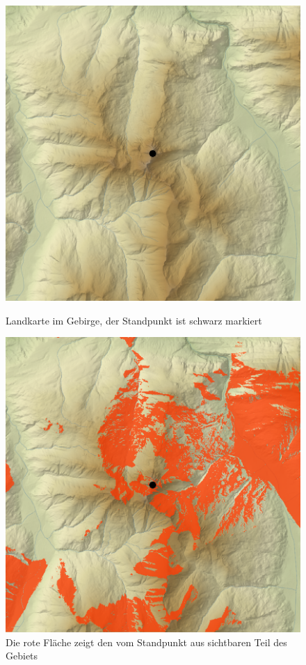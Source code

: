 \begin{figure}[!ht]
\begin{minipage}{0.45\textwidth}
\centering
\includegraphics[scale=0.85]{bilder/berg_viewpoint}
\caption{Landkarte im Gebirge, der Standpunkt ist schwarz markiert}
\end{minipage}
\hfill
\begin{minipage}{0.45\textwidth}
\centering
\includegraphics[scale=0.85]{bilder/berg_viewshed}
\caption{Die rote Fläche zeigt den vom Standpunkt aus sichtbaren Teil des Gebiets}
\end{minipage}
\end{figure}

